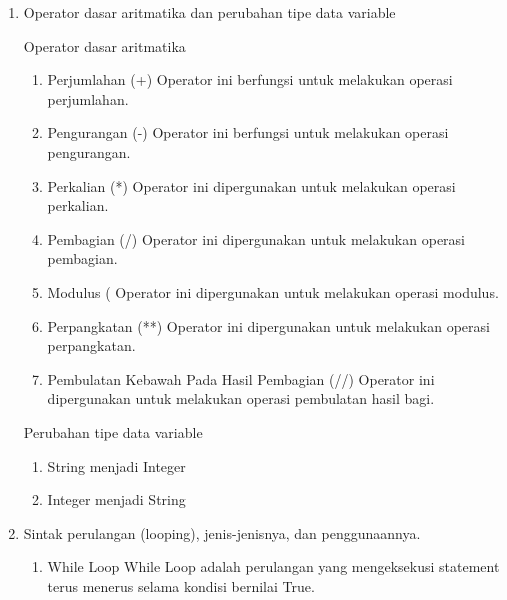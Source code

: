 \begin{enumerate}
\item Operator dasar aritmatika dan perubahan tipe data variable

Operator dasar aritmatika
\begin{enumerate}
\item Perjumlahan (+)
Operator ini berfungsi untuk melakukan operasi perjumlahan.

\item Pengurangan (-)
Operator ini berfungsi untuk melakukan operasi pengurangan.

\item Perkalian (*)
Operator ini dipergunakan untuk melakukan operasi perkalian.

\item Pembagian (/)
Operator ini dipergunakan untuk melakukan operasi pembagian.

\item Modulus (%
Operator ini dipergunakan untuk melakukan operasi modulus.

\item Perpangkatan (**)
Operator ini dipergunakan untuk melakukan operasi perpangkatan.

\item Pembulatan Kebawah Pada Hasil Pembagian (//)
Operator ini dipergunakan untuk melakukan operasi pembulatan hasil bagi.

\end{enumerate}

Perubahan tipe data variable
\begin{enumerate}
\item String menjadi Integer

\item Integer menjadi String

\end{enumerate}


\item Sintak perulangan (looping), jenis-jenisnya, dan penggunaannya.
\begin{enumerate}
\item While Loop
While Loop adalah perulangan yang mengeksekusi statement terus menerus selama kondisi bernilai True.



\end{enumerate}
\end{enumerate}
